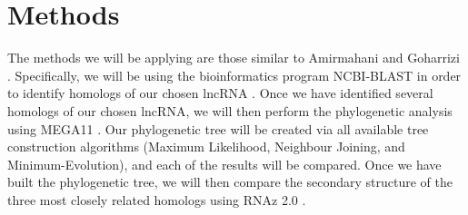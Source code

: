 \documentclass[conference]{IEEEtran}
\begin{document}
\section{Methods}

The methods we will be applying are those similar to Amirmahani and Goharrizi \cite{amirmahani2018phylogenetic}. 
Specifically, we will be using the bioinformatics program NCBI-BLAST in order to identify homologs of our chosen lncRNA \cite{madden2012blast,blastTool}. 
Once we have identified several homologs of our chosen lncRNA, we will then perform the phylogenetic analysis using MEGA11 \cite{tamura2021mega11}. 
Our phylogenetic tree will be created via all available tree construction algorithms (Maximum Likelihood, Neighbour Joining, and Minimum-Evolution), and each of the results will be compared. 
Once we have built the phylogenetic tree, we will then compare the secondary structure of the three most closely related homologs using RNAz 2.0 \cite{gruber2010rnaz}.



\end{document}
